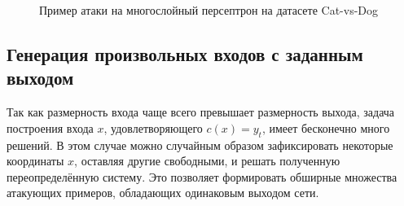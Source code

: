 \begin{figure}[ht]
    \caption{Пример атаки на многослойный персептрон на датасете Cat-vs-Dog~\cite{parkhi2012cats}}
    \label{fig:multilayer_attack_example}
\end{figure}

\subsection{Генерация произвольных входов с заданным выходом}

Так как размерность входа чаще всего превышает размерность выхода, задача построения входа \(x\), удовлетворяющего \(c(x) = y_t\), имеет бесконечно много решений. В этом случае можно случайным образом зафиксировать некоторые координаты \(x\), оставляя другие свободными, и решать полученную переопределённую систему. Это позволяет формировать обширные множества атакующих примеров, обладающих одинаковым выходом сети.

